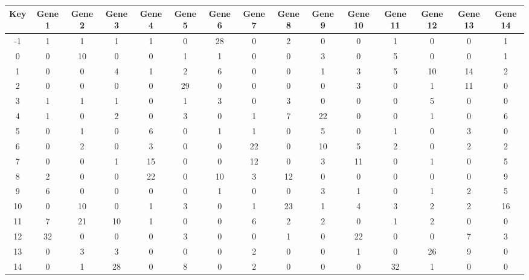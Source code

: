 \begin{tabular}{|c|c|c|c|c|c|c|c|c|c|c|c|c|c|c|}
\hline
Key & Gene 1 & Gene 2 & Gene 3 & Gene 4 & Gene 5 & Gene 6 & Gene 7 & Gene 8 & Gene 9 & Gene 10 & Gene 11 & Gene 12 & Gene 13 & Gene 14 \\
\hline
-1 & 1 & 1 & 1 & 1 & 0 & 28 & 0 & 2 & 0 & 0 & 1 & 0 & 0 & 1 \\
0 & 0 & 10 & 0 & 0 & 1 & 1 & 0 & 0 & 3 & 0 & 5 & 0 & 0 & 1 \\
1 & 0 & 0 & 4 & 1 & 2 & 6 & 0 & 0 & 1 & 3 & 5 & 10 & 14 & 2 \\
2 & 0 & 0 & 0 & 0 & 29 & 0 & 0 & 0 & 0 & 3 & 0 & 1 & 11 & 0 \\
3 & 1 & 1 & 1 & 0 & 1 & 3 & 0 & 3 & 0 & 0 & 0 & 5 & 0 & 0 \\
4 & 1 & 0 & 2 & 0 & 3 & 0 & 1 & 7 & 22 & 0 & 0 & 1 & 0 & 6 \\
5 & 0 & 1 & 0 & 6 & 0 & 1 & 1 & 0 & 5 & 0 & 1 & 0 & 3 & 0 \\
6 & 0 & 2 & 0 & 3 & 0 & 0 & 22 & 0 & 10 & 5 & 2 & 0 & 2 & 2 \\
7 & 0 & 0 & 1 & 15 & 0 & 0 & 12 & 0 & 3 & 11 & 0 & 1 & 0 & 5 \\
8 & 2 & 0 & 0 & 22 & 0 & 10 & 3 & 12 & 0 & 0 & 0 & 0 & 0 & 9 \\
9 & 6 & 0 & 0 & 0 & 0 & 1 & 0 & 0 & 3 & 1 & 0 & 1 & 2 & 5 \\
10 & 0 & 10 & 0 & 1 & 3 & 0 & 1 & 23 & 1 & 4 & 3 & 2 & 2 & 16 \\
11 & 7 & 21 & 10 & 1 & 0 & 0 & 6 & 2 & 2 & 0 & 1 & 2 & 0 & 0 \\
12 & 32 & 0 & 0 & 0 & 3 & 0 & 0 & 1 & 0 & 22 & 0 & 0 & 7 & 3 \\
13 & 0 & 3 & 3 & 0 & 0 & 0 & 2 & 0 & 0 & 1 & 0 & 26 & 9 & 0 \\
14 & 0 & 1 & 28 & 0 & 8 & 0 & 2 & 0 & 0 & 0 & 32 & 1 & 0 & 0 \\
\hline
\end{tabular}